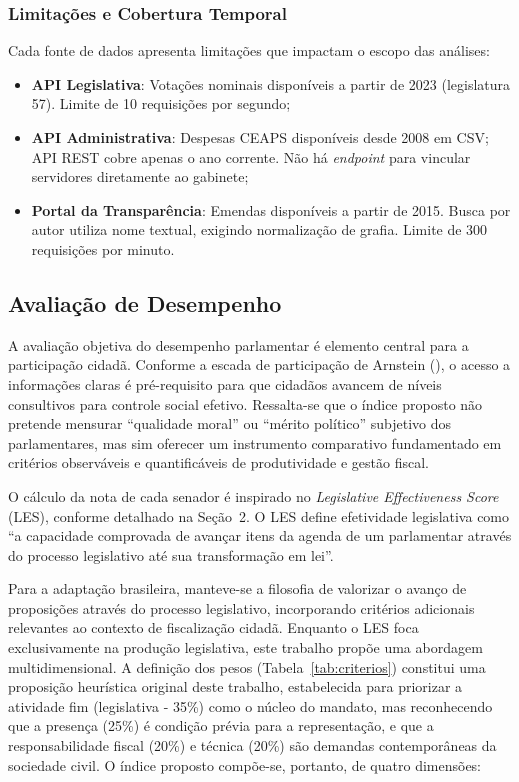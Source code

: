 \subsubsection{Limitações e Cobertura Temporal}

Cada fonte de dados apresenta limitações que impactam o escopo das análises:

\begin{itemize}
    \item \textbf{API Legislativa}: Votações nominais disponíveis a partir de 2023 (legislatura 57). Limite de 10 requisições por segundo;
    \item \textbf{API Administrativa}: Despesas CEAPS disponíveis desde 2008 em CSV; API REST cobre apenas o ano corrente. Não há \textit{endpoint} para vincular servidores diretamente ao gabinete;
    \item \textbf{Portal da Transparência}: Emendas disponíveis a partir de 2015. Busca por autor utiliza nome textual, exigindo normalização de grafia. Limite de 300 requisições por minuto.
\end{itemize}

\subsection{Avaliação de Desempenho}
\label{sec:avaliacao-desempenho}

A avaliação objetiva do desempenho parlamentar é elemento central para a participação cidadã. Conforme a escada de participação de Arnstein (\citeyear{arnstein1969ladder}), o acesso a informações claras é pré-requisito para que cidadãos avancem de níveis consultivos para controle social efetivo. Ressalta-se que o índice proposto não pretende mensurar ``qualidade moral'' ou ``mérito político'' subjetivo dos parlamentares, mas sim oferecer um instrumento comparativo fundamentado em critérios observáveis e quantificáveis de produtividade e gestão fiscal.

O cálculo da nota de cada senador é inspirado no \textit{Legislative Effectiveness Score} (LES), conforme detalhado na Seção~2. O LES define efetividade legislativa como ``a capacidade comprovada de avançar itens da agenda de um parlamentar através do processo legislativo até sua transformação em lei''.

Para a adaptação brasileira, manteve-se a filosofia de valorizar o avanço de proposições através do processo legislativo, incorporando critérios adicionais relevantes ao contexto de fiscalização cidadã. Enquanto o LES foca exclusivamente na produção legislativa, este trabalho propõe uma abordagem multidimensional. A definição dos pesos (Tabela~\ref{tab:criterios}) constitui uma proposição heurística original deste trabalho, estabelecida para priorizar a atividade fim (legislativa - 35\%) como o núcleo do mandato, mas reconhecendo que a presença (25\%) é condição prévia para a representação, e que a responsabilidade fiscal (20\%) e técnica (20\%) são demandas contemporâneas da sociedade civil. O índice proposto compõe-se, portanto, de quatro dimensões:

